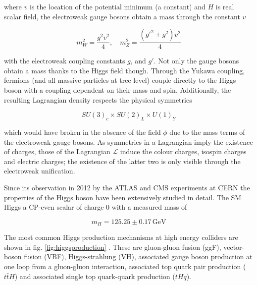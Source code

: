 where $v$ is the location of the potential minimum (a constant) and $H$ is real scalar field, the electroweak gauge bosons  obtain a mass through the constant $v$

\begin{equation*}
	m^2_W = \frac{g^2 v^2}{4}, \quad m^2_Z = \frac{(g'^2 + g^2)v^2}{4}
\end{equation*}

with the electroweak coupling constants $g$, and $g'$. Not only the gauge bosons obtain a mass thanks to the Higgs field though. Through the Yukawa coupling, fermions (and all massive particles at tree level) couple directly to the Higgs boson with a coupling dependent on their mass and spin. Additionally, the resulting Lagrangian density respects the physical symmetries

\begin{equation*}
	SU(3)_c \times SU(2)_L \times U(1)_Y
\end{equation*}

which would have broken in the absence of the field $\phi$ due to the mass terms of the electroweak gauge bosons. As symmetries in a Lagrangian imply the existence of charges, those of the Lagrangian $\mathcal{L}$ induce the colour charges, isospin charges and electric charges; the existence of the latter two is only visible through the electroweak unification.

Since its observation in 2012 by the ATLAS and CMS experiments at CERN \cite{Chatrchyan_2012} the properties of the Higgs boson have been extensively studied in detail. The SM Higgs a CP-even scalar of charge 0 with a measured mass of

\begin{equation*}
	m_H = 125.25 \pm 0.17 \, \text{GeV}
\end{equation*}

The most common Higgs production mechanisms at high energy colliders are shown in fig. \ref{fig:higgsproduction} \cite{Workman:2022ynf}. These are gluon-gluon fusion (ggF), vector-boson fusion (VBF), Higgs-strahlung (VH), associated gauge boson production at one loop from a gluon-gluon interaction, associated top quark pair production ($t\bar{t}H$) and associated single top quark-quark production ($tHq$).


